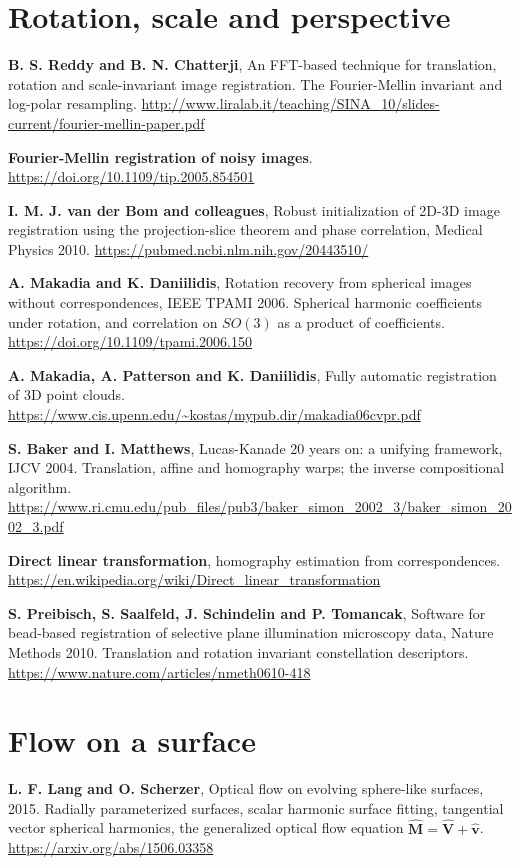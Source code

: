 \section*{Rotation, scale and perspective}

\textbf{B. S. Reddy and B. N. Chatterji}, An FFT-based technique for translation, rotation and
scale-invariant image registration. The Fourier-Mellin invariant and log-polar resampling.
\url{http://www.liralab.it/teaching/SINA_10/slides-current/fourier-mellin-paper.pdf}

\textbf{Fourier-Mellin registration of noisy images}.
\url{https://doi.org/10.1109/tip.2005.854501}

\textbf{I. M. J. van der Bom and colleagues}, Robust initialization of 2D-3D image registration using
the projection-slice theorem and phase correlation, Medical Physics 2010.
\url{https://pubmed.ncbi.nlm.nih.gov/20443510/}

\textbf{A. Makadia and K. Daniilidis}, Rotation recovery from spherical images without
correspondences, IEEE TPAMI 2006. Spherical harmonic coefficients under rotation, and correlation on
\(SO(3)\) as a product of coefficients. \url{https://doi.org/10.1109/tpami.2006.150}

\textbf{A. Makadia, A. Patterson and K. Daniilidis}, Fully automatic registration of 3D point clouds.
\url{https://www.cis.upenn.edu/~kostas/mypub.dir/makadia06cvpr.pdf}

\textbf{S. Baker and I. Matthews}, Lucas-Kanade 20 years on: a unifying framework, IJCV 2004.
Translation, affine and homography warps; the inverse compositional algorithm.
\url{https://www.ri.cmu.edu/pub_files/pub3/baker_simon_2002_3/baker_simon_2002_3.pdf}

\textbf{Direct linear transformation}, homography estimation from correspondences.
\url{https://en.wikipedia.org/wiki/Direct_linear_transformation}

\textbf{S. Preibisch, S. Saalfeld, J. Schindelin and P. Tomancak}, Software for bead-based registration
of selective plane illumination microscopy data, Nature Methods 2010. Translation and rotation
invariant constellation descriptors. \url{https://www.nature.com/articles/nmeth0610-418}

\section*{Flow on a surface}

\textbf{L. F. Lang and O. Scherzer}, Optical flow on evolving sphere-like surfaces, 2015. Radially
parameterized surfaces, scalar harmonic surface fitting, tangential vector spherical harmonics, the
generalized optical flow equation \(\hat{\mathbf{M}} = \hat{\mathbf{V}} + \hat{\mathbf{v}}\).
\url{https://arxiv.org/abs/1506.03358}

